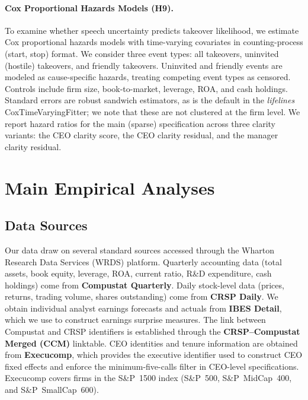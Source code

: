 \documentclass[12pt,a4paper]{article}
\begin{document}
\paragraph{Cox Proportional Hazards Models (H9).}
To examine whether speech uncertainty predicts takeover likelihood, we estimate Cox proportional hazards models with time-varying covariates in counting-process (start, stop) format. We consider three event types: all takeovers, uninvited (hostile) takeovers, and friendly takeovers. Uninvited and friendly events are modeled as cause-specific hazards, treating competing event types as censored. Controls include firm size, book-to-market, leverage, ROA, and cash holdings. Standard errors are robust sandwich estimators, as is the default in the \textit{lifelines} CoxTimeVaryingFitter; we note that these are not clustered at the firm level. We report hazard ratios for the main (sparse) specification across three clarity variants: the CEO clarity score, the CEO clarity residual, and the manager clarity residual.

\section{Main Empirical Analyses}
\label{sec:main}

\subsection{Data Sources}
\label{sec:data}

Our data draw on several standard sources accessed through the Wharton Research Data Services (WRDS) platform. Quarterly accounting data (total assets, book equity, leverage, ROA, current ratio, R\&D expenditure, cash holdings) come from \textbf{Compustat Quarterly}. Daily stock-level data (prices, returns, trading volume, shares outstanding) come from \textbf{CRSP Daily}. We obtain individual analyst earnings forecasts and actuals from \textbf{IBES Detail}, which we use to construct earnings surprise measures. The link between Compustat and CRSP identifiers is established through the \textbf{CRSP--Compustat Merged (CCM)} linktable. CEO identities and tenure information are obtained from \textbf{Execucomp}, which provides the executive identifier used to construct CEO fixed effects and enforce the minimum-five-calls filter in CEO-level specifications. Execucomp covers firms in the S\&P~1500 index (S\&P~500, S\&P~MidCap~400, and S\&P~SmallCap~600).
\end{document}
